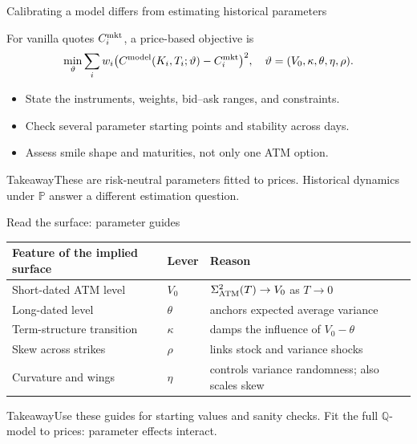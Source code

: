 \documentclass[handout,10pt,t,aspectratio=169]{beamer}
\newenvironment{keybox}{\begin{exampleblock}{Takeaway}}{\end{exampleblock}}
\newcommand{\Q}{\mathbb Q}
\newcommand{\Pp}{\mathbb P}
\begin{document}
\begin{frame}{Calibrating a model differs from estimating historical parameters}

    For vanilla quotes \(C_i^{\rm mkt}\), a price-based objective is
    \[\min_{\vartheta}\sum_iw_i
      \big(C^{\rm model}(K_i,T_i;\vartheta)-C_i^{\rm mkt}\big)^2,
      \quad\vartheta=(V_0,\kappa,\theta,\eta,\rho).\]
    \begin{itemize}
    \item State the instruments, weights, bid--ask ranges, and constraints.
    \item Check several parameter starting points and stability across days.
    \item Assess smile shape and maturities, not only one ATM option.
    \end{itemize}
    \begin{keybox}These are risk-neutral parameters fitted to prices.
    Historical dynamics under \(\Pp\) answer a different estimation question.\end{keybox}
\end{frame}
\begin{frame}{Read the surface: parameter guides}
\small
\begin{center}
\begin{tabular}{@{}L{.30\textwidth}L{.08\textwidth}L{.52\textwidth}@{}}
\toprule Feature of the implied surface & Lever & Reason\\\midrule
Short-dated ATM level & \(V_0\) & \(\Sigma_{\rm ATM}^2(T)\to V_0\) as \(T\to0\)\\[.3em]
Long-dated level & \(\theta\) & anchors expected average variance\\[.3em]
Term-structure transition & \(\kappa\) & damps the influence of \(V_0-\theta\)\\[.3em]
Skew across strikes & \(\rho\) & links stock and variance shocks\\[.3em]
Curvature and wings & \(\eta\) & controls variance randomness; also scales skew\\\bottomrule
\end{tabular}
\end{center}
\begin{keybox}Use these guides for starting values and sanity checks.
Fit the full \(\Q\)-model to prices: parameter effects interact.\end{keybox}
\end{frame}
\end{document}
